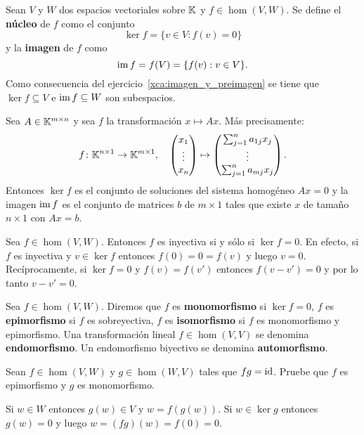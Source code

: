 \begin{block}
	Sean $V$ y $W$ dos espacios vectoriales sobre $\mathbb{K}$ y $f\in\hom(V,W)$. 
	Se define el \textbf{núcleo} de $f$ como el conjunto
	\[
		\ker f=\{v\in V: f(v)=0\}
	\]
	y la \textbf{imagen} de $f$ como 
	\[
    \operatorname{im} f=f(V)=\{f(v):v\in V\}.
	\]
	Como consecuencia del ejercicio~\ref{xca:imagen_y_preimagen} se tiene que
	$\ker f\subseteq V$ e $\operatorname{im} f\subseteq W$ son subespacios.
\end{block}

\begin{example}
	Sea $A\in\mathbb{K}^{m\times n}$ y sea $f$ la transformación $x\mapsto Ax$. Más precisamente:
	\[
	f\colon\mathbb{K}^{n\times1}\to\mathbb{K}^{m\times1},
	\quad
	\begin{pmatrix}
		x_1\\
		\vdots\\
		x_n
	\end{pmatrix}
	\mapsto
	\begin{pmatrix}
		\sum_{j=1}^n a_{1j}x_j\\
		\vdots\\
		\sum_{j=1}^n a_{mj}x_j
	\end{pmatrix}.
	\]
	Entonces $\ker f$ es el conjunto de soluciones del sistema homogéneo $Ax=0$
	y la imagen $\operatorname{im} f$ es el conjunto de matrices $b$ de $m\times1$ tales que
	existe $x$ de tamaño $n\times1$ con $Ax=b$. 
\end{example}

\begin{block}
	Sea $f\in\hom(V,W)$. Entonces $f$ es inyectiva si y sólo si $\ker f=0$. En
	efecto, si $f$ es inyectiva y $v\in\ker f$ entonces $f(0)=0=f(v)$ y luego
	$v=0$. Recíprocamente, si $\ker f=0$ y $f(v)=f(v')$ entonces $f(v-v')=0$ y
	por lo tanto $v-v'=0$.
\end{block}

\begin{block}
	Sea $f\in\hom(V,W)$. Diremos que $f$ es \textbf{monomorfismo} si $\ker f=0$, $f$
	es \textbf{epimorfismo} si $f$ es sobreyectiva, $f$ es \textbf{isomorfismo}
	si $f$ es monomorfismo y epimorfismo. Una transformación lineal $f\in\hom(V,V)$
	se denomina \textbf{endomorfismo}.  Un endomorfismo biyectivo se denomina
	\textbf{automorfismo}.
\end{block}

\begin{xca}
	\label{xca:fg=id}
	Sean $f\in\hom(V,W)$ y $g\in\hom(W,V)$ tales que $fg=\operatorname{id}$. Pruebe que $f$ es
	epimorfismo y $g$ es monomorfismo. 

	\begin{solution}
		Si $w\in W$ entonces $g(w)\in V$ y $w=f(g(w))$. Si $w\in\ker g$ entonces
		$g(w)=0$ y luego $w=(fg)(w)=f(0)=0$. 
	\end{solution}
\end{xca}


